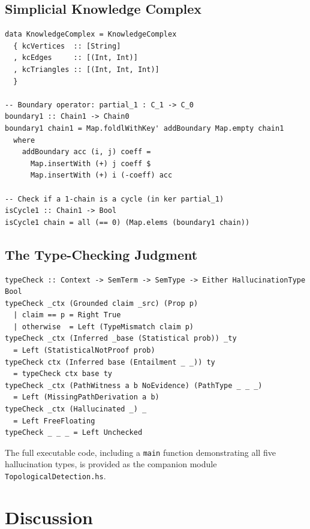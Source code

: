 \documentclass[11pt,a4paper]{article}
\theoremstyle{plain}
\theoremstyle{definition}
\theoremstyle{remark}
\begin{document}
\subsection{Simplicial Knowledge Complex}

\begin{lstlisting}[caption={Knowledge complex and homology.}]
data KnowledgeComplex = KnowledgeComplex
  { kcVertices  :: [String]
  , kcEdges     :: [(Int, Int)]
  , kcTriangles :: [(Int, Int, Int)]
  }

-- Boundary operator: partial_1 : C_1 -> C_0
boundary1 :: Chain1 -> Chain0
boundary1 chain1 = Map.foldlWithKey' addBoundary Map.empty chain1
  where
    addBoundary acc (i, j) coeff =
      Map.insertWith (+) j coeff $
      Map.insertWith (+) i (-coeff) acc

-- Check if a 1-chain is a cycle (in ker partial_1)
isCycle1 :: Chain1 -> Bool
isCycle1 chain = all (== 0) (Map.elems (boundary1 chain))
\end{lstlisting}

\subsection{The Type-Checking Judgment}

\begin{lstlisting}[caption={Type-checking as hallucination detection.}]
typeCheck :: Context -> SemTerm -> SemType -> Either HallucinationType Bool
typeCheck _ctx (Grounded claim _src) (Prop p)
  | claim == p = Right True
  | otherwise  = Left (TypeMismatch claim p)
typeCheck _ctx (Inferred _base (Statistical prob)) _ty
  = Left (StatisticalNotProof prob)
typeCheck ctx (Inferred base (Entailment _ _)) ty
  = typeCheck ctx base ty
typeCheck _ctx (PathWitness a b NoEvidence) (PathType _ _ _)
  = Left (MissingPathDerivation a b)
typeCheck _ctx (Hallucinated _) _
  = Left FreeFloating
typeCheck _ _ _ = Left Unchecked
\end{lstlisting}

The full executable code, including a \texttt{main} function demonstrating all five hallucination types, is provided as the companion module \texttt{TopologicalDetection.hs}.

\section{Discussion}
\label{sec:discussion}
\end{document}
